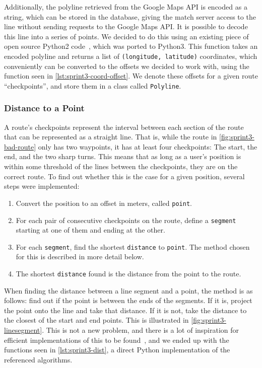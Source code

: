 Additionally, the polyline retrieved from the Google Maps API is encoded as a string, which can be stored in the database, giving the match server access to the line without sending requests to the Google Maps \ac{API}. It is possible to decode this line into a series of points. We decided to do this using an existing piece of open source Python2 code~\citep{decodepolyline}, which was ported to Python3. This function takes an encoded polyline and returns a list of \texttt{(longitude, latitude)} coordinates, which conveniently can be converted to the offsets we decided to work with, using the function seen in \autoref{lst:sprint3-coord-offset}. We denote these offsets for a given route ``checkpoints'', and store them in a class called \texttt{Polyline}.

\subsubsection{Distance to a Point}
A route's checkpoints represent the interval between each section of the route that can be represented as a straight line. That is, while the route in \autoref{fig:sprint3-bad-route} only has two waypoints, it has at least four checkpoints: The start, the end, and the two sharp turns. This means that as long as a user's position is within some threshold of the lines between the checkpoints, they are on the correct route. To find out whether this is the case for a given position, several steps were implemented:

\begin{enumerate}
	\item{Convert the position to an offset in meters, called \texttt{point}.}
	\item{For each pair of consecutive checkpoints on the route, define a \texttt{segment} starting at one of them and ending at the other.}
	\item{For each \texttt{segment}, find the shortest \texttt{distance} to \texttt{point}. The method chosen for this is described in more detail below.}
	\item{The shortest \texttt{distance} found is the distance from the point to the route.}
\end{enumerate}

When finding the distance between a line segment and a point, the method is as follows: find out if the point is between the ends of the segments. If it is, project the point onto the line and take that distance. If it is not, take the distance to the closest of the start and end points. This is illustrated in \autoref{fig:sprint3-linesegment}. This is not a new problem, and there is a lot of inspiration for efficient implementations of this to be found~\citep{point2line1,point2line2}, and we ended up with the functions seen in \autoref{lst:sprint3-dist}, a direct Python implementation of the referenced algorithms.

